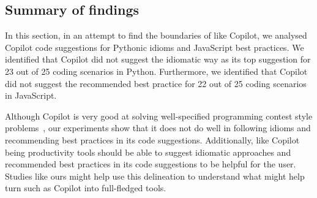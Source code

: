 \subsection{Summary of findings}
In this section, in an attempt to find the boundaries of \cct{} like Copilot, we analysed Copilot code suggestions for Pythonic idioms and JavaScript best practices. 
We identified that Copilot did not suggest the idiomatic way as its top suggestion for 23 out of 25 coding scenarios in Python. 
Furthermore, we identified that Copilot did not suggest the recommended best practice for 22 out of 25 coding scenarios in JavaScript.

Although Copilot is very good at solving well-specified programming contest style problems~\cite{empirical_eval}, our experiments show that it does not do well in following idioms and recommending best practices in its code suggestions.
Additionally, \cct{} like Copilot being productivity tools should be able to suggest idiomatic approaches and recommended best practices in its code suggestions to be helpful for the user.
Studies like ours might help use this delineation to understand what might help turn \cct{} such as Copilot into full-fledged \AISE{} tools.